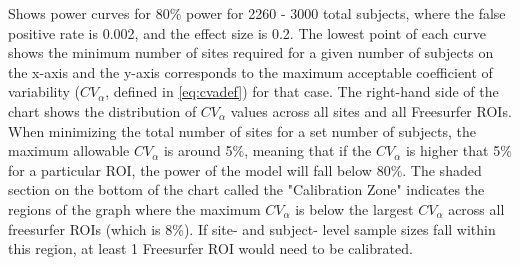 \label{fig:cv_j} Shows power curves for 80\% power for 2260 - 3000 total subjects, where the false positive rate is 0.002, and the effect size is 0.2. The lowest point of each curve shows the minimum number of sites required for a given number of subjects on the x-axis and the y-axis corresponds to the maximum acceptable coefficient of variability ($CV_{\alpha}$, defined in \ref{eq:cvadef}) for that case. The right-hand side of the chart shows the distribution of $CV_{\alpha}$ values across all sites and all Freesurfer ROIs. When minimizing the total number of sites for a set number of subjects, the maximum allowable $CV_{\alpha}$ is around 5\%, meaning that if the $CV_{\alpha}$ is higher that 5\% for a particular ROI, the power of the model will fall below 80\%. The shaded section on the bottom of the chart called the "Calibration Zone" indicates the regions of the graph where the maximum $CV_{\alpha}$ is below the largest $CV_{\alpha}$ across all freesurfer ROIs (which is 8\%). If site- and subject- level sample sizes fall within this region, at least 1 Freesurfer ROI would need to be calibrated.